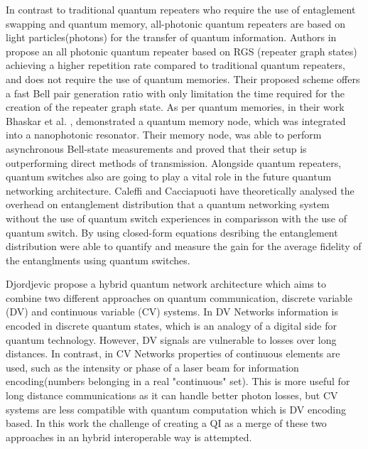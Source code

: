 \documentclass[12pt]{ieeetj}
\begin{document}
		In contrast to traditional quantum repeaters who require the use of entaglement swapping and quantum memory, all-photonic quantum repeaters
		are based on light particles(photons) for the transfer of quantum information.
		Authors in \cite{repeater1} propose an all photonic quantum repeater 
		based on RGS (repeater graph states) achieving a higher repetition rate compared to traditional quantum repeaters, and does not require 
		the use of quantum memories. Their proposed scheme offers a fast Bell pair generation ratio with only
		limitation the time required for the creation of the repeater graph state. 
		As per quantum memories, in their work Bhaskar et al. \cite{memories}, demonstrated a quantum memory node, which
		was integrated into a nanophotonic resonator. Their memory node, was able to perform asynchronous Bell-state measurements
		and proved that their setup is outperforming direct methods of transmission. Alongside quantum repeaters, quantum switches also
		are going to play a vital role in the future quantum networking architecture. Caleffi and Cacciapuoti \cite{quantum-switch1}
		have theoretically analysed the overhead on entanglement distribution that a quantum networking system 
		without the use of quantum switch experiences in comparisson with the use of quantum switch. By using closed-form equations
		desribing the entanglement distribution were able to quantify and measure the gain for the average fidelity of the entanglments
		using quantum switches.
	
	

		Djordjevic\cite{cvdv} propose a hybrid quantum network architecture which aims to combine two different approaches
		on quantum communication, discrete variable (DV) and continuous variable (CV) systems. 
		In DV Networks information is encoded in discrete quantum states, which is an analogy of a digital side for quantum technology.
		However, DV signals are vulnerable to losses over long distances. In contrast, in CV Networks properties of continuous elements are used,
		such as the intensity or phase of a laser beam for information encoding(numbers belonging in a real "continuous" set). 
		This is more useful for long distance communications as it can handle better photon losses, but CV systems are less compatible with quantum computation
		which is DV encoding based. In this work the challenge of creating a QI as a merge of these two approaches in an
		hybrid interoperable way is attempted.
\end{document}
